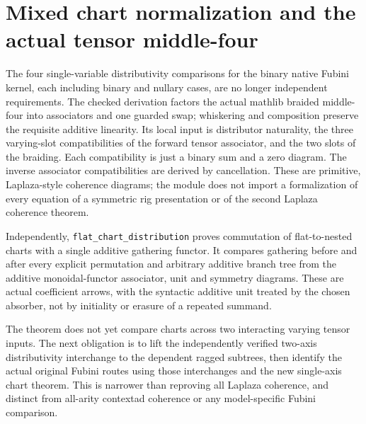 \documentclass{article}
\begin{document}
\section*{Mixed chart normalization and the actual tensor middle-four}
The four single-variable distributivity comparisons for the binary native
Fubini kernel, each including binary and nullary cases, are no longer
independent requirements. The checked derivation factors the actual
mathlib braided middle-four into associators and one guarded swap;
whiskering and composition preserve the requisite additive linearity.
Its local input is distributor naturality, the three varying-slot
compatibilities of the forward tensor associator, and the two slots of
the braiding. Each compatibility is just a binary sum and a zero diagram.
The inverse associator compatibilities are derived by cancellation.
These are primitive, Laplaza-style coherence diagrams; the module does
not import a formalization of every equation of a symmetric rig
presentation or of the second Laplaza coherence theorem.

Independently, \texttt{flat\_chart\_distribution} proves commutation of
flat-to-nested charts with a single additive gathering functor. It
compares gathering before and after every explicit permutation and
arbitrary additive branch tree from the additive monoidal-functor
associator, unit and symmetry diagrams. These are actual coefficient
arrows, with the syntactic additive unit treated by the chosen
absorber, not by initiality or erasure of a repeated summand.

The theorem does not yet compare charts across two interacting varying
tensor inputs. The next obligation is to lift the independently
verified two-axis distributivity interchange to the dependent ragged
subtrees, then identify the actual original Fubini routes using those
interchanges and the new single-axis chart theorem. This is narrower
than reproving all Laplaza coherence, and distinct from all-arity
contextad coherence or any model-specific Fubini comparison.
\end{document}
